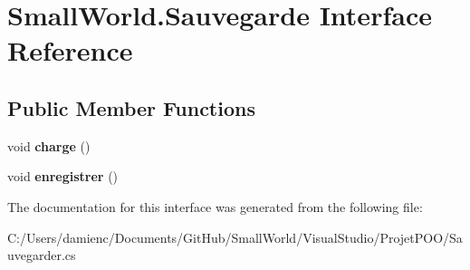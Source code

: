 \hypertarget{interface_small_world_1_1_sauvegarde}{\section{Small\-World.\-Sauvegarde Interface Reference}
\label{interface_small_world_1_1_sauvegarde}
}
\subsection*{Public Member Functions}
\begin{DoxyCompactItemize}
\item 
\hypertarget{interface_small_world_1_1_sauvegarde_ac7bb1123afba8099288cab74e6a481cc}{void {\bfseries charge} ()}\label{interface_small_world_1_1_sauvegarde_ac7bb1123afba8099288cab74e6a481cc}

\item 
\hypertarget{interface_small_world_1_1_sauvegarde_a18e071e5ec26c588ca4d93f0e9f6acfb}{void {\bfseries enregistrer} ()}\label{interface_small_world_1_1_sauvegarde_a18e071e5ec26c588ca4d93f0e9f6acfb}

\end{DoxyCompactItemize}


The documentation for this interface was generated from the following file\-:\begin{DoxyCompactItemize}
\item 
C\-:/\-Users/damienc/\-Documents/\-Git\-Hub/\-Small\-World/\-Visual\-Studio/\-Projet\-P\-O\-O/Sauvegarder.\-cs\end{DoxyCompactItemize}
